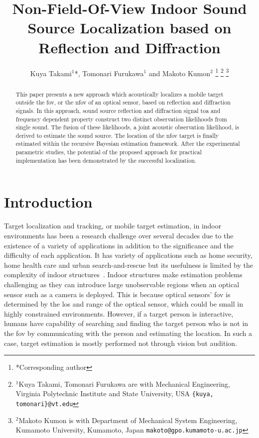 \documentclass[letterpaper, 10 pt, conference]{ieeeconf}  %
\title{\LARGE \bf
Non-Field-Of-View Indoor Sound Source Localization based on Reflection and Diffraction
}
\author{Kuya Takami$^{1}$*, Tomonari Furukawa$^{1}$ and Makoto Kumon$^{2}$%
\thanks{*Corresponding author}%
\thanks{$^{1}$Kuya Takami, Tomonari Furukawa are with Mechanical Engineering, Virginia Polytechnic Institute and State University, USA
        {\tt\small \{kuya, tomonari\}@vt.edu}}
\thanks{$^{2}$Makoto Kumon is with Department of Mechanical System Engineering, Kumamoto University, Kumamoto, Japan
        {\tt\small makoto@gpo.kumamoto-u.ac.jp}}}
\begin{document}
\maketitle
\thispagestyle{empty}
\pagestyle{empty}
\begin{abstract}
This paper presents a new approach which acoustically localizes a mobile target outside the \gls{fov}, or the \gls{nfov} of an optical sensor, based on reflection and diffraction signals. In this approach, sound source reflection and diffraction signal \gls{toa} and frequency dependent property construct two distinct observation likelihoods from single sound. The fusion of these likelihoods, a joint acoustic observation likelihood, is derived to estimate the sound source. The location of the \gls{nfov} target is finally estimated within the recursive Bayesian estimation framework.  After the experimental parametric studies, the potential of the proposed approach for practical implementation has been demonstrated by the successful localization.
\end{abstract}
\section{Introduction}
Target localization and tracking, or mobile target estimation, in indoor environments has been a research challenge over several decades due to the existence of a variety of applications in addition to the significance and the difficulty of each application. It has variety of applications such as home security, home health care and urban search-and-rescue but its usefulness is limited by the complexity of indoor structures~\cite{priyantha2005mobile,Khoury2009,argentieri2014survey}. Indoor structures make estimation problems challenging as they can introduce large unobservable regions when an optical sensor such as a camera is deployed.  This is because optical sensors' \acrfull{fov} is determined by the \gls{los} and range of the optical sensor, which could be small in highly constrained environments. However, if a target person is interactive, humans have capability of searching and finding the target person who is not in the \gls{fov} by communicating with the person and estimating the location. In such a case, target estimation is mostly performed not through vision but audition. 
\end{document}

